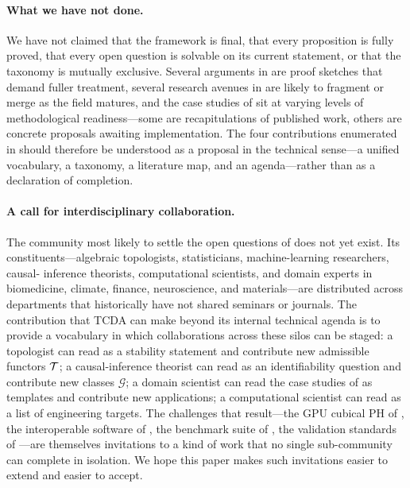 \paragraph{What we have not done.}
We have not claimed that the framework is final, that every
proposition is fully proved, that every open question is solvable on
its current statement, or that the taxonomy is mutually exclusive.
Several arguments in  are
proof sketches that demand fuller treatment, several research
avenues in  are likely to fragment or merge as
the field matures, and the case studies of 
sit at varying levels of methodological readiness---some are
recapitulations of published work, others are concrete proposals
awaiting implementation. The four contributions enumerated in
 should therefore be understood as a
proposal in the technical sense---a unified vocabulary, a
taxonomy, a literature map, and an agenda---rather than as a
declaration of completion.

\paragraph{A call for interdisciplinary collaboration.}
The community most likely to settle the open questions of
 does not yet exist. Its constituents---algebraic
topologists, statisticians, machine-learning researchers, causal-
inference theorists, computational scientists, and domain experts in
biomedicine, climate, finance, neuroscience, and materials---are
distributed across departments that historically have not shared
seminars or journals. The contribution that TCDA can make beyond its
internal technical agenda is to provide a vocabulary in which
collaborations across these silos can be staged: a topologist can
read  as a stability statement and
contribute new admissible functors $\mathcal{T}$; a causal-inference theorist
can read  as an identifiability question
and contribute new classes $\mathcal{G}$; a domain scientist can read
the case studies of  as templates and
contribute new applications; a computational scientist can read
 as a list of engineering targets. The
challenges that result---the GPU cubical PH of
, the interoperable software of
, the benchmark suite of , the
validation standards of ---are
themselves invitations to a kind of work that no single sub-community
can complete in isolation. We hope this paper makes such invitations
easier to extend and easier to accept.

